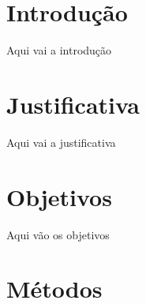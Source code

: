 \documentclass[
	12pt,				%
	openright,			%
	oneside,			%
	a4paper,			%
	english,			%
	french,				%
	spanish,			%
	brazil,				%
	]{abntex2}
\begin{document}
\frenchspacing 


\imprimircapa

\imprimirfolhaderosto


\tableofcontents
\cleardoublepage


\textual

\chapter{Introdução}

Aqui vai a introdução

\chapter{Justificativa}

Aqui vai a justificativa

\chapter{Objetivos}

Aqui vão os objetivos

\chapter{Métodos}
\end{document}
